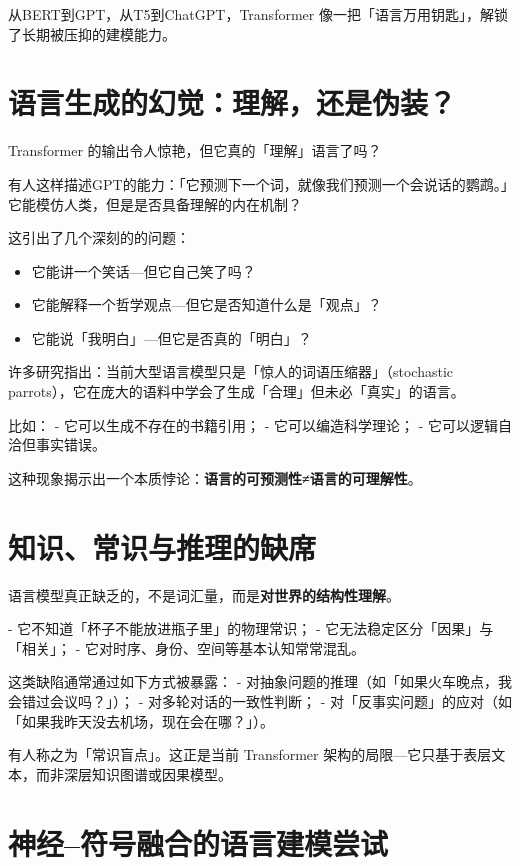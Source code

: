从BERT到GPT，从T5到ChatGPT，Transformer 像一把「语言万用钥匙」，解锁了长期被压抑的建模能力。

\section*{语言生成的幻觉：理解，还是伪装？}

Transformer 的输出令人惊艳，但它真的「理解」语言了吗？

有人这样描述GPT的能力：「它预测下一个词，就像我们预测一个会说话的鹦鹉。」它能模仿人类，但是是否具备理解的内在机制？

这引出了几个深刻的的问题：
\begin{itemize}
\item 它能讲一个笑话---但它自己笑了吗？
\item 它能解释一个哲学观点---但它是否知道什么是「观点」？
\item 它能说「我明白」---但它是否真的「明白」？
\end{itemize}

许多研究指出：当前大型语言模型只是「惊人的词语压缩器」（stochastic parrots），它在庞大的语料中学会了生成「合理」但未必「真实」的语言。

比如：
- 它可以生成不存在的书籍引用；
- 它可以编造科学理论；
- 它可以逻辑自洽但事实错误。

这种现象揭示出一个本质悖论：\textbf{语言的可预测性≠语言的可理解性}。

\section*{知识、常识与推理的缺席}

语言模型真正缺乏的，不是词汇量，而是\textbf{对世界的结构性理解}。

- 它不知道「杯子不能放进瓶子里」的物理常识；
- 它无法稳定区分「因果」与「相关」；
- 它对时序、身份、空间等基本认知常常混乱。

这类缺陷通常通过如下方式被暴露：
- 对抽象问题的推理（如「如果火车晚点，我会错过会议吗？」）；
- 对多轮对话的一致性判断；
- 对「反事实问题」的应对（如「如果我昨天没去机场，现在会在哪？」）。

有人称之为「常识盲点」。这正是当前 Transformer 架构的局限---它只基于表层文本，而非深层知识图谱或因果模型。

\section*{神经–符号融合的语言建模尝试}


